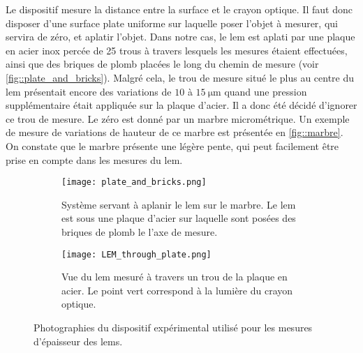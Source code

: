            Le dispositif mesure la distance entre la surface et le crayon optique. Il faut donc disposer d'une surface plate uniforme sur laquelle poser l'objet à mesurer, qui servira de zéro, et aplatir l'objet. Dans notre cas, le \gls{lem} est aplati par une plaque en acier inox percée de 25 trous à travers lesquels les mesures étaient effectuées, ainsi que des briques de plomb placées le long du chemin de mesure (voir \autoref{fig::plate_and_bricks}). Malgré cela, le trou de mesure situé le plus au centre du \gls{lem} présentait encore des variations de $10$ à $\SI{15}{\micro\meter}$ quand une pression supplémentaire était appliquée sur la plaque d'acier. Il a donc été décidé d'ignorer ce trou de mesure. Le zéro est donné  par un marbre micrométrique. Un exemple de mesure de variations de hauteur de ce marbre est présentée en \autoref{fig::marbre}. On constate que le marbre présente une légère pente, qui peut facilement être prise en compte dans les mesures du \gls{lem}.

          \begin{figure}[!htb]
            \begin{subfigure}[t]{0.5\textwidth}
              \centering
              \texttt{[image: plate\_and\_bricks.png]}
              \caption{\label{fig::plate_and_bricks}Système servant à aplanir le \gls{lem} sur le marbre. Le \gls{lem} est sous une plaque d'acier sur laquelle sont posées des briques de plomb le l'axe de mesure.}
            \end{subfigure}
            \hfill
            \begin{subfigure}[t]{0.395\textwidth}
              \centering
              \texttt{[image: LEM\_through\_plate.png]}
              \caption{\label{fig::LEM_through_plate}Vue du \gls{lem} mesuré à travers un trou de la plaque en acier. Le point vert correspond à la lumière du crayon optique.}
            \end{subfigure}
            \caption[Photographies du dispositif expérimental utilisé pour les mesures d'épaisseur des LEM]{\label{fig::dispositif_experimental}Photographies du dispositif expérimental utilisé pour les mesures d'épaisseur des \glspl{lem}.}
          \end{figure}

